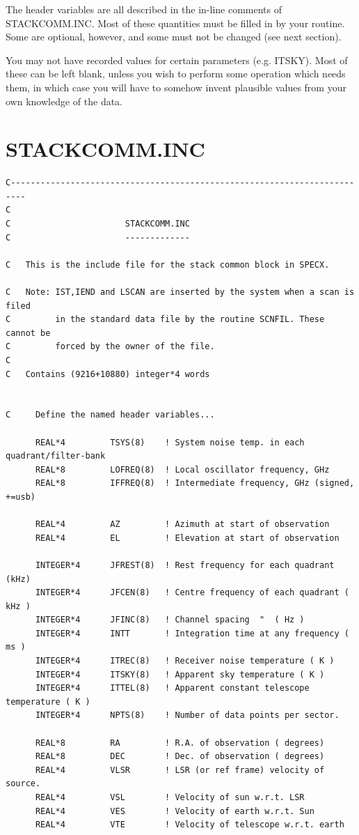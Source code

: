 \documentclass[11pt,twoside]{report}
\begin{document}
The header variables are all described in the in-line comments of
STACKCOMM.INC. Most of these quantities must be filled in by your
routine. Some are optional, however, and some must not be changed
(see next section).

You may not have recorded values for certain parameters (e.g. ITSKY).
Most of these can be left blank, unless you wish to perform some
operation which needs them, in which case you will have to somehow
invent plausible values from your own knowledge of the data.

\newpage
\section{STACKCOMM.INC}   
\begin{verbatim}
C-------------------------------------------------------------------------
C
C                       STACKCOMM.INC
C                       -------------

C   This is the include file for the stack common block in SPECX.

C   Note: IST,IEND and LSCAN are inserted by the system when a scan is filed
C         in the standard data file by the routine SCNFIL. These cannot be
C         forced by the owner of the file.
C
C   Contains (9216+10880) integer*4 words


C     Define the named header variables...

      REAL*4         TSYS(8)    ! System noise temp. in each quadrant/filter-bank
      REAL*8         LOFREQ(8)  ! Local oscillator frequency, GHz
      REAL*8         IFFREQ(8)  ! Intermediate frequency, GHz (signed, +=usb)

      REAL*4         AZ         ! Azimuth at start of observation
      REAL*4         EL         ! Elevation at start of observation

      INTEGER*4      JFREST(8)  ! Rest frequency for each quadrant (kHz)
      INTEGER*4      JFCEN(8)   ! Centre frequency of each quadrant ( kHz )
      INTEGER*4      JFINC(8)   ! Channel spacing  "  ( Hz )
      INTEGER*4      INTT       ! Integration time at any frequency ( ms )
      INTEGER*4      ITREC(8)   ! Receiver noise temperature ( K )
      INTEGER*4      ITSKY(8)   ! Apparent sky temperature ( K )
      INTEGER*4      ITTEL(8)   ! Apparent constant telescope temperature ( K )
      INTEGER*4      NPTS(8)    ! Number of data points per sector.

      REAL*8         RA         ! R.A. of observation ( degrees)
      REAL*8         DEC        ! Dec. of observation ( degrees)
      REAL*4         VLSR       ! LSR (or ref frame) velocity of source.
      REAL*4         VSL        ! Velocity of sun w.r.t. LSR
      REAL*4         VES        ! Velocity of earth w.r.t. Sun
      REAL*4         VTE        ! Velocity of telescope w.r.t. earth


\end{verbatim}
\end{document}
